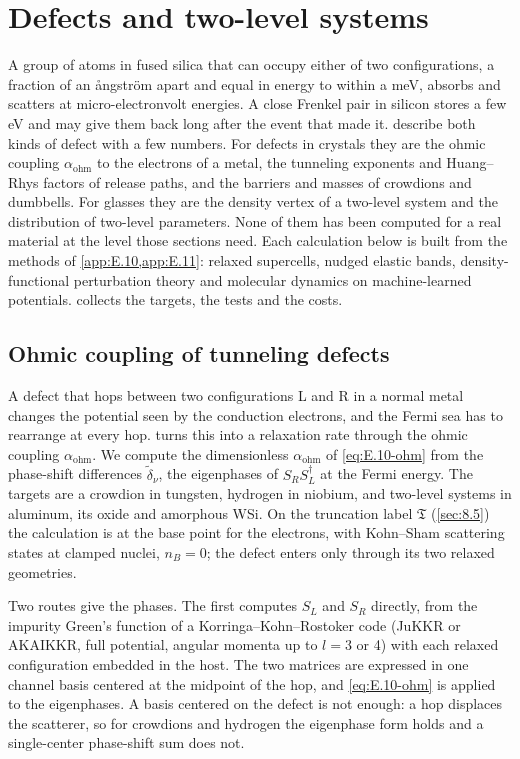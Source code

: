 \section{Defects and two-level systems}\label{app:E.22}

A group of atoms in fused silica that can occupy either of two configurations, a fraction of an \r{a}ngstr\"om apart and equal in energy to within a meV, absorbs and scatters at micro-electronvolt energies. A close Frenkel pair in silicon stores a few eV and may give them back long after the event that made it.  describe both kinds of defect with a few numbers. For defects in crystals they are the ohmic coupling $\alpha_{\mathrm{ohm}}$ to the electrons of a metal, the tunneling exponents and Huang--Rhys factors of release paths, and the barriers and masses of crowdions and dumbbells. For glasses they are the density vertex of a two-level system and the distribution of two-level parameters. None of them has been computed for a real material at the level those sections need. Each calculation below is built from the methods of \cref{app:E.10,app:E.11}: relaxed supercells, nudged elastic bands, density-functional perturbation theory and molecular dynamics on machine-learned potentials.  collects the targets, the tests and the costs.

\subsection{Ohmic coupling of tunneling defects}

A defect that hops between two configurations L and R in a normal metal changes the potential seen by the conduction electrons, and the Fermi sea has to rearrange at every hop.  turns this into a relaxation rate through the ohmic coupling $\alpha_{\mathrm{ohm}}$. We compute the dimensionless $\alpha_{\mathrm{ohm}}$ of \cref{eq:E.10-ohm} from the phase-shift differences $\tilde\delta_\nu$, the eigenphases of $S_RS_L^\dagger$ at the Fermi energy. The targets are a crowdion in tungsten, hydrogen in niobium, and two-level systems in aluminum, its oxide and amorphous WSi. On the truncation label $\mathfrak{T}$ (\cref{sec:8.5}) the calculation is at the base point for the electrons, with Kohn--Sham scattering states at clamped nuclei, $n_B = 0$; the defect enters only through its two relaxed geometries.

Two routes give the phases. The first computes $S_L$ and $S_R$ directly, from the impurity Green's function of a Korringa--Kohn--Rostoker code (JuKKR or AKAIKKR, full potential, angular momenta up to $l = 3$ or 4) with each relaxed configuration embedded in the host. The two matrices are expressed in one channel basis centered at the midpoint of the hop, and \cref{eq:E.10-ohm} is applied to the eigenphases. A basis centered on the defect is not enough: a hop displaces the scatterer, so for crowdions and hydrogen the eigenphase form holds and a single-center phase-shift sum does not.

